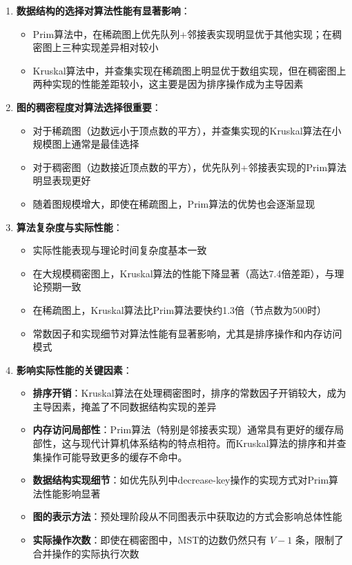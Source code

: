 \documentclass[a4paper,12pt]{ctexart}
\begin{document}
\begin{enumerate}
    \item \textbf{数据结构的选择对算法性能有显著影响}：
    \begin{itemize}
        \item Prim算法中，在稀疏图上优先队列+邻接表实现明显优于其他实现；在稠密图上三种实现差异相对较小
        \item Kruskal算法中，并查集实现在稀疏图上明显优于数组实现，但在稠密图上两种实现的性能差距较小，这主要是因为排序操作成为主导因素
    \end{itemize}
    
    \item \textbf{图的稠密程度对算法选择很重要}：
    \begin{itemize}
        \item 对于稀疏图（边数远小于顶点数的平方），并查集实现的Kruskal算法在小规模图上通常是最佳选择
        \item 对于稠密图（边数接近顶点数的平方），优先队列+邻接表实现的Prim算法明显表现更好
        \item 随着图规模增大，即使在稀疏图上，Prim算法的优势也会逐渐显现
    \end{itemize}
    
    \item \textbf{算法复杂度与实际性能}：
    \begin{itemize}
        \item 实际性能表现与理论时间复杂度基本一致
        \item 在大规模稠密图上，Kruskal算法的性能下降显著（高达7.4倍差距），与理论预期一致
        \item 在稀疏图上，Kruskal算法比Prim算法要快约1.3倍（节点数为500时）
        \item 常数因子和实现细节对算法性能有显著影响，尤其是排序操作和内存访问模式
    \end{itemize}
    
    \item \textbf{影响实际性能的关键因素}：
    \begin{itemize}
        \item \textbf{排序开销}：Kruskal算法在处理稠密图时，排序的常数因子开销较大，成为主导因素，掩盖了不同数据结构实现的差异
        \item \textbf{内存访问局部性}：Prim算法（特别是邻接表实现）通常具有更好的缓存局部性，这与现代计算机体系结构的特点相符\cite{cache_locality}。而Kruskal算法的排序和并查集操作可能导致更多的缓存不命中。
        \item \textbf{数据结构实现细节}：如优先队列中decrease-key操作的实现方式对Prim算法性能影响显著
        \item \textbf{图的表示方法}：预处理阶段从不同图表示中获取边的方式会影响总体性能
        \item \textbf{实际操作次数}：即使在稠密图中，MST的边数仍然只有 $V-1$ 条，限制了合并操作的实际执行次数
    \end{itemize}
    

\end{enumerate}
\end{document}
